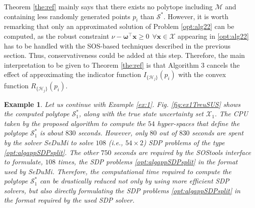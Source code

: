 \documentclass[twocolumn]{autart}
\newtheorem{example}{Example} {\normalfont}{\normalfont}
\newcommand{\DP}[1]{{#1}}
\begin{document}
\DP{Theorem \ref{the:ref} mainly says that there exists no polytope including $\mathcal{M}$ and containing less randomly generated  points $p_i$ than  $\mathcal{S}^{*}$.   However, it is worth remarking that only an approximated solution  of Problem \eqref{opt:alg22} can be computed,  as the robust constraint $\nu- \boldsymbol{\omega}^{\top}   \mathbf{x} \geq 0  \ \ \forall \mathbf{x} \in \mathcal{X}$ appearing in \eqref{opt:alg22} has to be handled with the SOS-based  techniques described in the previous section. Thus, conservativeness could be added at this step. Therefore, the main interpretation to be given to Theorem \ref{the:ref}  is that    Algorithm 3 cancels the effect of approximating the indicator function $I_{\{\mathcal{H}_j\}}(p_i)$ with the convex function $R_{\{\mathcal{H}_j\}}(p_i)$.}

\begin{example}
 \label{ex:4}
Let us continue with Example \ref{ex:1}. Fig. \ref{fig:ex1TreuSUS} shows the computed polytope $\mathcal{S}^*_1$, along with the true state uncertainty set $\mathcal{X}_1$. %
The   CPU taken by the proposed algorithm to compute the $54$ hyper-spaces that define the polytope  $\mathcal{S}^*_1$  is about $830$ seconds. However, only $80$ out of $830$ seconds are spent by the  solver \emph{SeDuMi} to solve $108$ (i.e., $54 \times 2$) SDP problems of the type \eqref{opt:algappSDPsplit}. The other $750$ seconds are required by the \emph{SOStools} interface to formulate, $108$ times, the SDP problems \eqref{opt:algappSDPsplit} in the format used by  SeDuMi. Therefore, the computational time required to compute the polytope $\mathcal{S}^*_1$ can be drastically reduced not only by using more efficient SDP solvers, but also directly formulating the SDP problems \eqref{opt:algappSDPsplit} in the format required by the used SDP solver.



\end{example}
\end{document}
